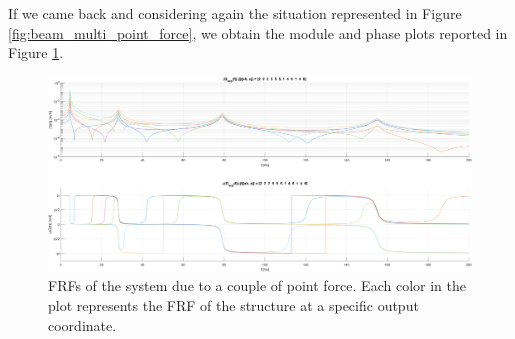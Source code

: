If we came back and considering again the situation represented in Figure \ref{fig:beam_multi_point_force}, we obtain the module and phase plots reported in Figure \ref{fig:FRFs_multi_point_force}.

\begin{figure}[H]
    \centering
    \includegraphics[width=\textwidth]{img/MATLAB/Part_A/Experimental_FRF_MIMO.png}
    \caption{FRFs of the system due to a couple of point force. Each color in the plot represents the FRF of the structure at a specific output coordinate.}
    \label{fig:FRFs_multi_point_force}
\end{figure}
